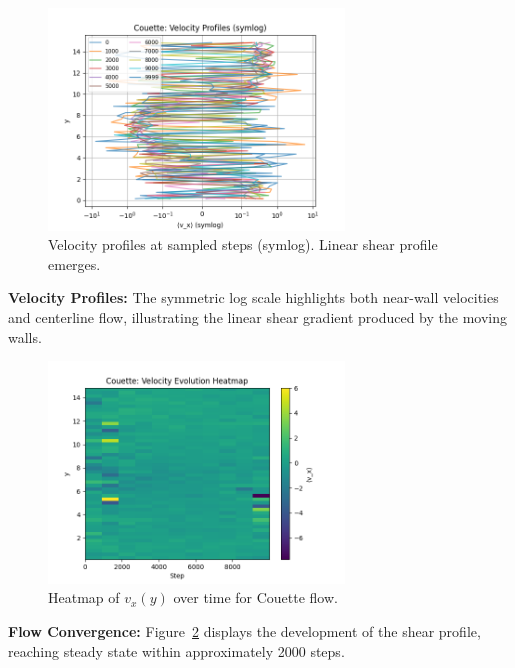 \documentclass[11pt,a4paper]{article}
\begin{document}
\begin{figure}[H]
  \centering
  \includegraphics[width=0.7\textwidth]{figures/couette/vprof_symlog.png}
  \caption{Velocity profiles at sampled steps (symlog). Linear shear profile emerges.}
  \label{fig:cou_vprof}
\end{figure}
\noindent \textbf{Velocity Profiles:} The symmetric log scale highlights both near-wall velocities and centerline flow, illustrating the linear shear gradient produced by the moving walls.

\begin{figure}[H]
  \centering
  \includegraphics[width=0.7\textwidth]{figures/couette/vprof_heatmap.png}
  \caption{Heatmap of $v_x(y)$ over time for Couette flow.}
  \label{fig:cou_heat}
\end{figure}
\noindent \textbf{Flow Convergence:} Figure~\ref{fig:cou_heat} displays the development of the shear profile, reaching steady state within approximately 2000 steps.
\end{document}
